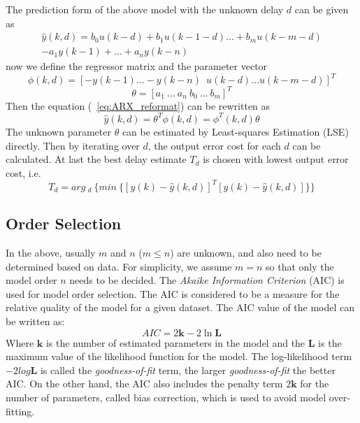 \documentclass[letterpaper, 12 pt, Journal, onecolumn]{ieeeconf}  %
\begin{document}
The prediction form of the above model with the unknown delay $d$ can be given as
\begin{equation} \label{eq:ARX_prediction}
\begin{aligned}
	\hat{y}(k,d) = b_0u(k-d)+b_1u(k-1-d) \ldots+b_mu(k-m-d)\\
	-a_1y(k-1)+\ldots+a_ny(k-n)
\end{aligned}
\end{equation}
now we define the regressor matrix and the parameter vector  
$$\phi(k,d) = [-y(k-1) \ldots -y(k-n) \enspace u(k-d) \ldots u(k-m-d)]^T$$ 
$$\theta=[a_1~\ldots ~a_n~b_0~\ldots~b_m]^T$$
Then the equation (~\ref{eq:ARX_reformat}) can be rewritten as
\begin{equation}
\hat{y}(k,d) = \theta^T \phi(k,d) = \phi^T(k,d)\theta
\end{equation}
	The unknown parameter $\theta$ can be estimated by Least-squares Estimation (LSE) directly. Then by iterating over $d$, the output error cost for each $d$ can be calculated. At last the best delay estimate $T_d$ is chosen with lowest output error cost, i.e.
\begin{equation}
T_d = arg~_{d} ~\biggl\{min ~\{[y(k)-\hat{y}(k,d)]^T[y(k)-\hat{y}(k,d)]\}\biggr\}
\end{equation}

	\subsection{Order Selection}
	In the above, usually $m$ and $n$ ($m\le n$) are unknown, and also need to be determined based on data. For simplicity, we assume $m=n$ so that only the model order $n$ needs to be decided. 
The \emph{Akaike Information Criterion} (AIC) is used for model order selection. The AIC is considered to be a measure for the relative quality of the model for a given dataset. The AIC value of the model can be written as:
	\begin{equation} \label{eq:AIC_eqn}
	 AIC = 2\mathbf{k} - 2\ln \mathbf{L}
	\end{equation}
Where $\mathbf{k}$ is the number of estimated parameters in the model and the $\mathbf{L}$ is the maximum value of the likelihood function for the model. The log-likelihood term $- 2log \mathbf{L}$ is called the \textit{goodness-of-fit} term, the larger \textit{goodness-of-fit} the better AIC. On the other hand, the AIC also includes the penalty term $2\mathbf{k}$ for the number of parameters, called bias correction, which is used to avoid model over-fitting.\\
\end{document}
